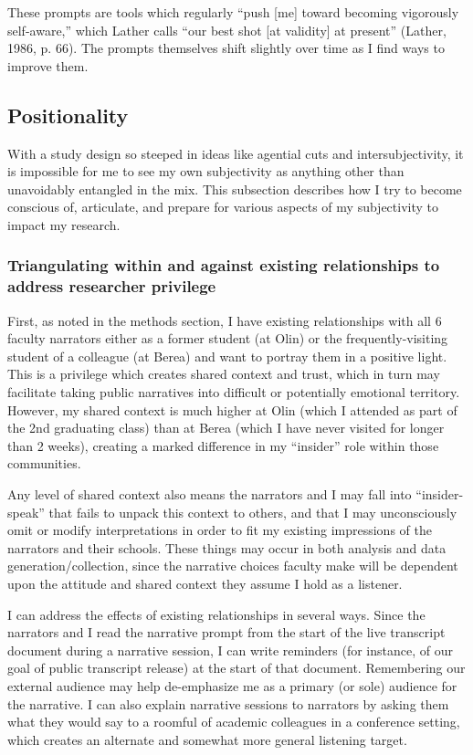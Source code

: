 These prompts are tools which regularly “push [me] toward becoming vigorously self-aware,” which Lather calls “our best shot [at validity] at present” (Lather, 1986, p. 66). The prompts themselves shift slightly over time as I find ways to improve them.

\subsection{Positionality}

With a study design so steeped in ideas like agential cuts and intersubjectivity, it is impossible for me to see my own subjectivity as anything other than unavoidably entangled in the mix. This subsection describes how I try to become conscious of, articulate, and prepare for various aspects of my subjectivity to impact my research.

\subsubsection{Triangulating within and against existing relationships to address researcher privilege}

First, as noted in the methods section, I have existing relationships with all 6 faculty narrators either as a former student (at Olin) or the frequently-visiting student of a colleague (at Berea) and want to portray them in a positive light. This is a privilege which creates shared context and trust, which in turn may facilitate taking public narratives into difficult or potentially emotional territory. However, my shared context is much higher at Olin (which I attended as part of the 2nd graduating class) than at Berea (which I have never visited for longer than 2 weeks), creating a marked difference in my “insider” role within those communities. 

Any level of shared context also means the narrators and I may fall into “insider-speak” that fails to unpack this context to others, and that I may unconsciously omit or modify interpretations in order to fit my existing impressions of the narrators and their schools. These things may occur in both analysis and data generation/collection, since the narrative choices faculty make will be dependent upon the attitude and shared context they assume I hold as a listener.

I can address the effects of existing relationships in several ways. Since the narrators and I read the narrative prompt from the start of the live transcript document during a narrative session, I can write reminders (for instance, of our goal of public transcript release) at the start of that document. Remembering our external audience may help de-emphasize me as a primary (or sole) audience for the narrative. I can also explain narrative sessions to narrators by asking them what they would say to a roomful of academic colleagues in a conference setting, which creates an alternate and somewhat more general listening target. 

